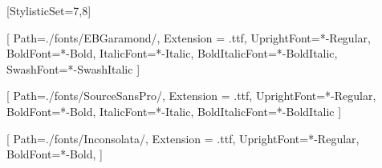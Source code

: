 \providecommand{\fontpath}{./fonts}
\usepackage[italian, english]{babel}
\usepackage[math-style=ISO, bold-style=ISO]{unicode-math}
[StylisticSet={7,8}]


\setmainfont{EBGaramond}[
    Path=\fontpath/EBGaramond/,
    Extension = .ttf,
    UprightFont=*-Regular,
    BoldFont=*-Bold,
    ItalicFont=*-Italic,
    BoldItalicFont=*-BoldItalic,
    SwashFont=*-SwashItalic
    ]

\setsansfont{SourceSansPro}[
	Path=\fontpath/SourceSansPro/,
	Extension = .ttf,
    UprightFont=*-Regular,
    BoldFont=*-Bold,
    ItalicFont=*-Italic,
    BoldItalicFont=*-BoldItalic
    ]

\setmonofont{Inconsolata}[
	Path=\fontpath/Inconsolata/,
    Extension = .ttf,
    UprightFont=*-Regular,
    BoldFont=*-Bold,
	]

